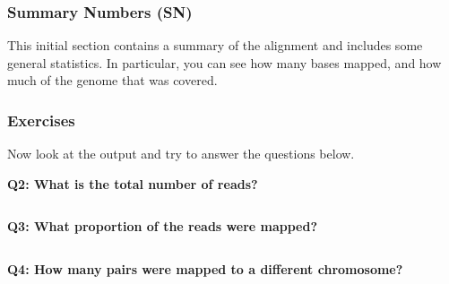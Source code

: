 \documentclass[11pt]{article}
\makeatletter
\newcommand{\boxspacing}{\kern\kvtcb@left@rule\kern\kvtcb@boxsep}
\newcommand{\prompt}[4]{
        {\ttfamily\llap{{\color{#2}[#3]:\hspace{3pt}#4}}\vspace{-\baselineskip}}
    }
\makeatother
\begin{document}
    \hypertarget{summary-numbers-sn}{%
\subsubsection{Summary Numbers (SN)}\label{summary-numbers-sn}}

This initial section contains a summary of the alignment and includes
some general statistics. In particular, you can see how many bases
mapped, and how much of the genome that was covered.

\hypertarget{exercises}{%
\subsubsection{Exercises}\label{exercises}}

    Now look at the output and try to answer the questions below.

\textbf{Q2: What is the total number of reads?}

    \begin{tcolorbox}[breakable, size=fbox, boxrule=1pt, pad at break*=1mm,colback=cellbackground, colframe=cellborder]
\prompt{In}{incolor}{ }{\boxspacing}
\begin{Verbatim}[commandchars=\\\{\}]

\end{Verbatim}
\end{tcolorbox}

    \textbf{Q3: What proportion of the reads were mapped?}

    \begin{tcolorbox}[breakable, size=fbox, boxrule=1pt, pad at break*=1mm,colback=cellbackground, colframe=cellborder]
\prompt{In}{incolor}{ }{\boxspacing}
\begin{Verbatim}[commandchars=\\\{\}]

\end{Verbatim}
\end{tcolorbox}

    \textbf{Q4: How many pairs were mapped to a different chromosome?}

    \begin{tcolorbox}[breakable, size=fbox, boxrule=1pt, pad at break*=1mm,colback=cellbackground, colframe=cellborder]
\prompt{In}{incolor}{ }{\boxspacing}
\begin{Verbatim}[commandchars=\\\{\}]

\end{Verbatim}
\end{tcolorbox}
\end{document}
